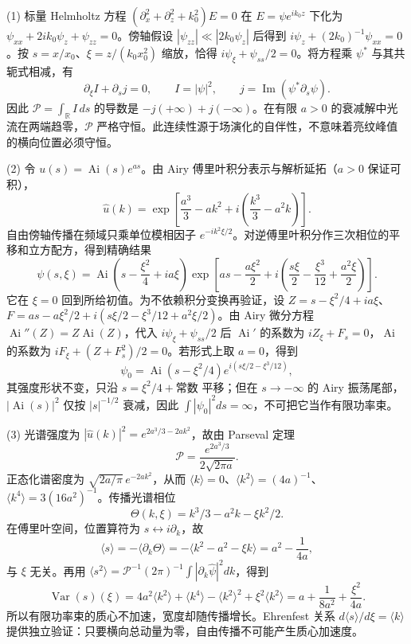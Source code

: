 (1) 标量 Helmholtz 方程 \((\partial_x^2+\partial_z^2+k_0^2)E=0\) 在 \(E=\psi e^{ik_0z}\) 下化为 \(\psi_{xx}+2ik_0\psi_z+\psi_{zz}=0\)。傍轴假设 \(|\psi_{zz}|\ll|2k_0\psi_z|\) 后得到 \(i\psi_z+(2k_0)^{-1}\psi_{xx}=0\)。按 \(s=x/x_0\)、\(\xi=z/(k_0x_0^2)\) 缩放，恰得 \(i\psi_\xi+\psi_{ss}/2=0\)。将方程乘 \(\psi^*\) 与其共轭式相减，有
\[
\boxed{\partial_\xi I+\partial_sj=0},\qquad
I=|\psi|^2,\qquad j=\operatorname{Im}(\psi^*\partial_s\psi).
\]
因此 \(\mathcal P=\int_{\mathbb R}I\,ds\) 的导数是 \(-j(+\infty)+j(-\infty)\)。在有限 \(a>0\) 的衰减解中光流在两端趋零，\(\mathcal P\) 严格守恒。此连续性源于场演化的自伴性，不意味着亮纹峰值的横向位置必须守恒。

(2) 令 \(u(s)=\operatorname{Ai}(s)e^{as}\)。由 Airy 傅里叶积分表示与解析延拓（\(a>0\) 保证可积），
\[
\widehat u(k)=\exp\!\left[\frac{a^3}{3}-ak^2+
i\left(\frac{k^3}{3}-a^2k\right)\right].
\]
自由傍轴传播在频域只乘单位模相因子 \(e^{-ik^2\xi/2}\)。对逆傅里叶积分作三次相位的平移和立方配方，得到精确结果
\[
\boxed{\psi(s,\xi)=\operatorname{Ai}\!\left(s-\frac{\xi^2}{4}+ia\xi\right)
\exp\!\left[as-\frac{a\xi^2}{2}
+i\left(\frac{s\xi}{2}-\frac{\xi^3}{12}+\frac{a^2\xi}{2}\right)\right]}.
\]
它在 \(\xi=0\) 回到所给初值。为不依赖积分变换再验证，设 \(Z=s-\xi^2/4+ia\xi\)、\(F=as-a\xi^2/2+i(s\xi/2-\xi^3/12+a^2\xi/2)\)。由 Airy 微分方程 \(\operatorname{Ai}''(Z)=Z\operatorname{Ai}(Z)\)，代入 \(i\psi_\xi+\psi_{ss}/2\) 后 \(\operatorname{Ai}'\) 的系数为 \(iZ_\xi+F_s=0\)，\(\operatorname{Ai}\) 的系数为 \(iF_\xi+(Z+F_s^2)/2=0\)。若形式上取 \(a=0\)，得到
\[
\psi_0=\operatorname{Ai}(s-\xi^2/4)
e^{i(s\xi/2-\xi^3/12)},
\]
其强度形状不变，只沿 \(s=\xi^2/4+\text{常数}\) 平移；但在 \(s\to-\infty\) 的 Airy 振荡尾部，\(|\operatorname{Ai}(s)|^2\) 仅按 \(|s|^{-1/2}\) 衰减，因此 \(\int|\psi_0|^2ds=\infty\)，不可把它当作有限功率束。

(3) 光谱强度为 \(\boxed{|\widehat u(k)|^2=e^{2a^3/3-2ak^2}}\)，故由 Parseval 定理
\[
\boxed{\mathcal P=\frac{e^{2a^3/3}}{2\sqrt{2\pi a}}}.
\]
正态化谱密度为 \(\sqrt{2a/\pi}\,e^{-2ak^2}\)，从而
\(\langle k\rangle=0\)、\(\langle k^2\rangle=(4a)^{-1}\)、\(\langle k^4\rangle=3(16a^2)^{-1}\)。传播光谱相位
\[
\Theta(k,\xi)=k^3/3-a^2k-\xi k^2/2.
\]
在傅里叶空间，位置算符为 \(s\leftrightarrow i\partial_k\)，故
\[
\langle s\rangle=-\langle\partial_k\Theta\rangle
=-\langle k^2-a^2-\xi k\rangle
=\boxed{a^2-\frac1{4a}},
\]
与 \(\xi\) 无关。再用 \(\langle s^2\rangle=\mathcal P^{-1}(2\pi)^{-1}\int|\partial_k\widehat\psi|^2dk\)，得到
\[
\operatorname{Var}(s)(\xi)=
4a^2\langle k^2\rangle+\langle k^4\rangle-\langle k^2\rangle^2+
\xi^2\langle k^2\rangle
=\boxed{a+\frac1{8a^2}+\frac{\xi^2}{4a}}.
\]
所以有限功率束的质心不加速，宽度却随传播增长。Ehrenfest 关系 \(d\langle s\rangle/d\xi=\langle k\rangle\) 提供独立验证：只要横向总动量为零，自由传播不可能产生质心加速度。

